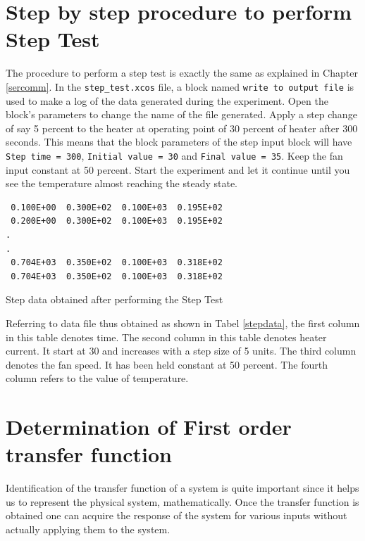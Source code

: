 \section{Step by step procedure to perform Step Test}
The procedure to perform a step test is exactly the same as explained in Chapter \ref{sercomm}. In the {\tt step\_test.xcos} file, a block named {\tt write to output file} is used to make a log of the data generated during the experiment. Open the block's parameters to change the name of the file generated. Apply a step change of say 5 percent to the heater at operating point of 30 percent of heater after 300 seconds. This means that the block parameters of the step input block will have {\tt Step time = 300}, {\tt Initial value = 30} and {\tt Final value = 35}. Keep the fan input constant at 50 percent. Start the experiment and let it continue until you see the temperature almost reaching the steady state. 
\begin{table}
\begin{verbatim}
 0.100E+00  0.300E+02  0.100E+03  0.195E+02
 0.200E+00  0.300E+02  0.100E+03  0.195E+02
.
.
 0.704E+03  0.350E+02  0.100E+03  0.318E+02
 0.704E+03  0.350E+02  0.100E+03  0.318E+02
\end{verbatim}
\caption{Step data obtained after performing the Step Test}
\label{stepdata}
\end{table}
Referring to data file thus obtained as shown in Tabel \ref{stepdata}, the first column in this table denotes time. The second column in this table denotes heater current. It start at 30 and increases with a step size of 5 units. The third column denotes the fan speed. It has been held constant at 50 percent. The fourth column refers to the value of temperature.


\section{Determination of First order transfer function}
Identification of the transfer function of a system is quite important since it helps us to represent the physical system, mathematically. Once the transfer function is obtained one can acquire the response of the system for various inputs without actually applying them to the system.

